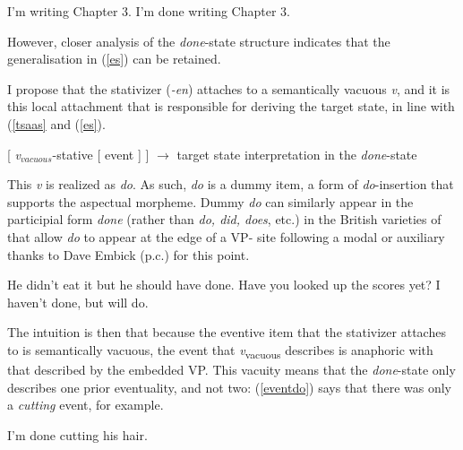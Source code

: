 \documentclass[output=paper]{langsci/langscibook}
\begin{document}
 \begin{exe}
\ex\label{progdrs}
\begin{xlist}
\ex  I'm writing Chapter 3.
\ex  I'm done writing Chapter 3.
\end{xlist}
\end{exe}



However, closer analysis of the \emph{done}-state structure indicates that the generalisation in (\ref{es}) can be retained.

I propose that the stativizer (\textit{-en}) attaches to a semantically vacuous \emph{v}, and it is this local attachment that is responsible for deriving the target state, in line with (\ref{tsaas} and (\ref{es}).

\begin{exe}
\ex\label{dsts}  {[ \emph{v}$_{vacuous}$-stative  [ event ] ]} $\rightarrow$ target state interpretation in the \emph{done}-state
\end{exe}

This \emph{v} is realized as \emph{do}. As such, \emph{do} is a dummy item, a
form of \emph{do}-insertion that supports the aspectual morpheme. Dummy
\emph{do} can similarly appear in the participial form \emph{done} (rather than
\emph{do, did, does}, etc.) in the British varieties of  that
allow \emph{do} to appear at the edge of a VP- site following a modal or auxiliary thanks to Dave Embick (p.c.) for this point.



\begin{exe}
\ex
\begin{xlist}
\ex He didn't eat it but he should have done.
\ex Have you looked up the scores yet? I haven't done, but will do.
\end{xlist}
\end{exe}



The intuition is then that because the eventive item that the stativizer
attaches to is semantically vacuous, the event that
\emph{v}\textsubscript{vacuous} describes is anaphoric with that described by
the embedded VP\@. This vacuity means that the \emph{done}-state only describes
one prior eventuality, and not two: (\ref{eventdo}) says that there was only a
\emph{cutting} event, for example.


\begin{exe}
\ex\label{eventdo} I'm done cutting his hair.
\end{exe}
\end{document}

